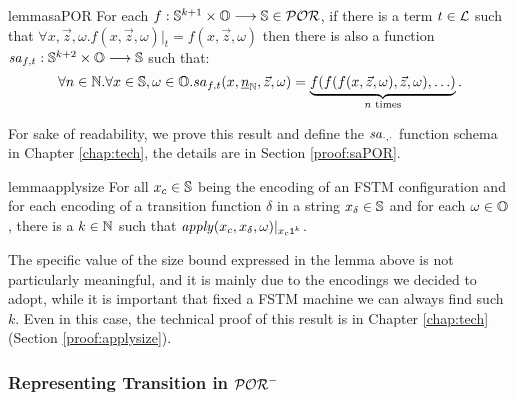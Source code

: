 \begin{restatable}{lemma}{saPOR}
  \label{lemma:saPOR}
  For each $f : \mathbb{S}^{k+1} \times \mathbb{O} \longrightarrow \mathbb{S} \in \mathcal{POR}$,
  if there is a term $t \in \mathcal{L}$ such that
  $\forall x, \vec z, \omega. f(x, \vec z, \omega)|_t = f(x, \vec z, \omega)$
  then there is also a function $\mathit{sa}_{f, t} : \mathbb{S}^{k+2} \times \mathbb{O} \longrightarrow \mathbb{S}$
  such that:
  $$
  \forall n \in \mathbb{N}. \forall x \in \mathbb{S},  \omega \in \mathbb{O}.
  sa_{f, t}(x, {\underline{n}}_{\mathbb{N}}, \vec z, \omega) =
  \underbrace{f(f(f(x, \vec z,  \omega), \vec z, \omega), \ldots)}_{n\text{ times}}.
  $$
\end{restatable}

\noindent
For sake of readability, we prove this result and define the
$\mathit{sa}_{\cdot, \cdot}$ function schema in Chapter \ref{chap:tech}, the details
are in Section \ref{proof:saPOR}.
%

\begin{restatable}{lemma}{applysize}
  \label{lemma:applysize}
  For all $x_c\in \mathbb{S}$ being the encoding of an FSTM configuration
  and for each encoding of a transition function $\delta$
  in a string $x_\delta \in \mathbb{S}$ and for each $\omega\in \mathbb{O}$, there is
  a $k \in \mathbb{N}$ such that
  $\mathit{apply}(x_c, x_\delta, \omega)|_{x_c\mathtt{1}^k}$.
\end{restatable}

\noindent
The specific value of the size bound expressed in the lemma above
is not particularly meaningful, and it is
mainly due to the encodings we decided to adopt, while it is important that
fixed a FSTM machine we can always find such $k$.
Even in this case, the technical proof of this result is in
Chapter \ref{chap:tech} (Section \ref{proof:applysize}).








\subsubsection{Representing Transition in $\mathcal{POR}^-$}

